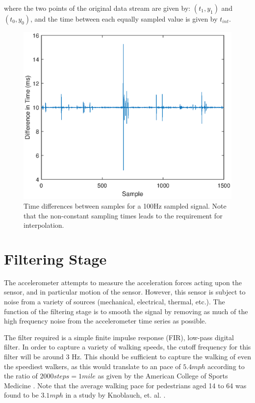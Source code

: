             where the two points of the original data stream are given by: $(t_1, y_1)$ and $(t_0, y_0)$, and the time between each equally sampled value is given by $t_{int}$.

            \begin{figure}[h]
                \includegraphics[width=\textwidth]{Images/sampling_freq.eps}
                \centering
                \caption{Time differences between samples for a 100Hz sampled signal. Note that the non-constant sampling times leads to the requirement for interpolation.}
                \label{img_sampling_freq}
            \end{figure}

        \section{Filtering Stage}

            The accelerometer attempts to measure the acceleration forces acting upon the sensor, and in particular motion of the sensor. However, this sensor is subject to noise from a variety of sources (mechanical, electrical, thermal, etc.). The function of the filtering stage is to smooth the signal by removing as much of the high frequency noise from the accelerometer time series as possible.

            The filter required is a simple finite impulse response (FIR), low-pass digital filter. In order to capture a variety of walking speeds, the cutoff frequency for this filter will be around 3 Hz. This should be sufficient to capture the walking of even the speediest walkers, as this would translate to an pace of $5.4 mph$ according to the ratio of $2000 steps = 1 mile$ as given by the American College of Sports Medicine \cite{acsm}. Note that the average walking pace for pedestrians aged 14 to 64 was found to be $3.1 mph$ in a study by Knoblauch, et. al. \cite{walking_speed}.

